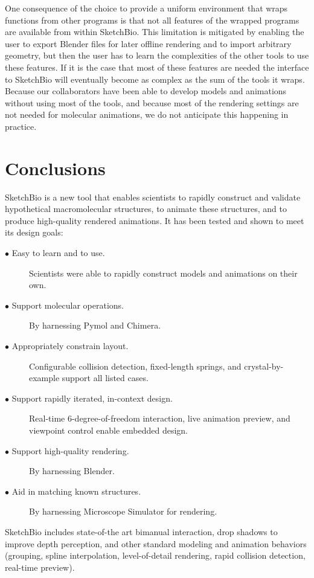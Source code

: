 \documentclass[twocolumn]{bmcart}%
\begin{document}
One consequence of the choice to provide a uniform environment that wraps functions from other programs is that not all features of the wrapped programs are available from within SketchBio. This limitation is mitigated by enabling the user to export Blender files for later offline rendering and to import arbitrary geometry, but then the user has to learn the complexities of the other tools to use these features. If it is the case that most of these features are needed the interface to SketchBio will eventually become as complex as the sum of the tools it wraps. Because our collaborators have been able to develop models and animations without using most of the tools, and because most of the rendering settings are not needed for molecular animations, we do not anticipate this happening in practice.

\section*{Conclusions}
SketchBio is a new tool that enables scientists to rapidly construct and validate hypothetical macromolecular structures, to animate these structures, and to produce high-quality rendered animations.
It has been tested and shown to meet its design goals:
\begin{description}
  \item[$\bullet$ Easy to learn and to use.] Scientists were able to rapidly construct models and animations on their own.
  \item[$\bullet$ Support molecular operations.] By harnessing Pymol and Chimera.
  \item[$\bullet$ Appropriately constrain layout.] Configurable collision detection, fixed-length springs, and crystal-by-example support all listed cases.
  \item[$\bullet$ Support rapidly iterated, in-context design.] Real-time 6-degree-of-freedom interaction, live animation preview, and viewpoint control enable embedded design.
  \item[$\bullet$ Support high-quality rendering.] By harnessing Blender.
  \item[$\bullet$ Aid in matching known structures.] By harnessing Microscope Simulator for rendering.
\end{description}

SketchBio includes state-of-the art bimanual interaction, drop shadows to improve depth perception, and other standard modeling and animation behaviors (grouping, spline interpolation, level-of-detail rendering, rapid collision detection, real-time preview).
\end{document}
